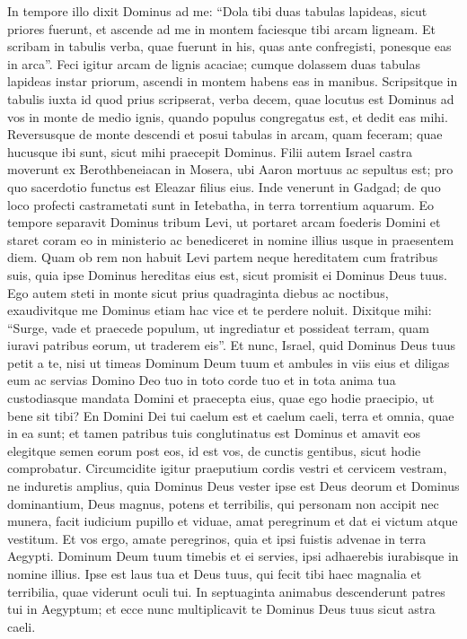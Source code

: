 \begin{biblechapter} 
\verse In tempore illo dixit Dominus ad me: “Dola tibi duas tabulas lapideas, sicut priores fuerunt, et ascende ad me in montem faciesque tibi arcam ligneam. 
\verse Et scribam in tabulis verba, quae fuerunt in his, quas ante confregisti, ponesque eas in arca”. 
\verse Feci igitur arcam de lignis acaciae; cumque dolassem duas tabulas lapideas instar priorum, ascendi in montem habens eas in manibus. 
\verse Scripsitque in tabulis iuxta id quod prius scripserat, verba decem, quae locutus est Dominus ad vos in monte de medio ignis, quando populus congregatus est, et dedit eas mihi. 
\verse Reversusque de monte descendi et posui tabulas in arcam, quam feceram; quae hucusque ibi sunt, sicut mihi praecepit Dominus. 
\verse Filii autem Israel castra moverunt ex Berothbeneiacan in Mosera, ubi Aaron mortuus ac sepultus est; pro quo sacerdotio functus est Eleazar filius eius.  
\verse Inde venerunt in Gadgad; de quo loco profecti castrametati sunt in Ietebatha, in terra torrentium aquarum. 
\verse Eo tempore separavit Dominus tribum Levi, ut portaret arcam foederis Domini et staret coram eo in ministerio ac benediceret in nomine illius usque in praesentem diem. 
\verse Quam ob rem non habuit Levi partem neque hereditatem cum fratribus suis, quia ipse Dominus hereditas eius est, sicut promisit ei Dominus Deus tuus. 
\verse Ego autem steti in monte sicut prius quadraginta diebus ac noctibus, exaudivitque me Dominus etiam hac vice et te perdere noluit. 
\verse Dixitque mihi: “Surge, vade et praecede populum, ut ingrediatur et possideat terram, quam iuravi patribus eorum, ut traderem eis”. 
\verse Et nunc, Israel, quid Dominus Deus tuus petit a te, nisi ut timeas Dominum Deum tuum et ambules in viis eius et diligas eum ac servias Domino Deo tuo in toto corde tuo et in tota anima tua 
\verse custodiasque mandata Domini et praecepta eius, quae ego hodie praecipio, ut bene sit tibi? 
\verse En Domini Dei tui caelum est et caelum caeli, terra et omnia, quae in ea sunt; 
\verse et tamen patribus tuis conglutinatus est Dominus et amavit eos elegitque semen eorum post eos, id est vos, de cunctis gentibus, sicut hodie comprobatur. 
\verse Circumcidite igitur praeputium cordis vestri et cervicem vestram, ne induretis amplius, 
\verse quia Dominus Deus vester ipse est Deus deorum et Dominus dominantium, Deus magnus, potens et terribilis, qui personam non accipit nec munera, 
\verse facit iudicium pupillo et viduae, amat peregrinum et dat ei victum atque vestitum. 
\verse Et vos ergo, amate peregrinos, quia et ipsi fuistis advenae in terra Aegypti. 
\verse Dominum Deum tuum timebis et ei servies, ipsi adhaerebis iurabisque in nomine illius. 
\verse Ipse est laus tua et Deus tuus, qui fecit tibi haec magnalia et terribilia, quae viderunt oculi tui. 
\verse In septuaginta animabus descenderunt patres tui in Aegyptum; et ecce nunc multiplicavit te Dominus Deus tuus sicut astra caeli. 
\end{biblechapter}


